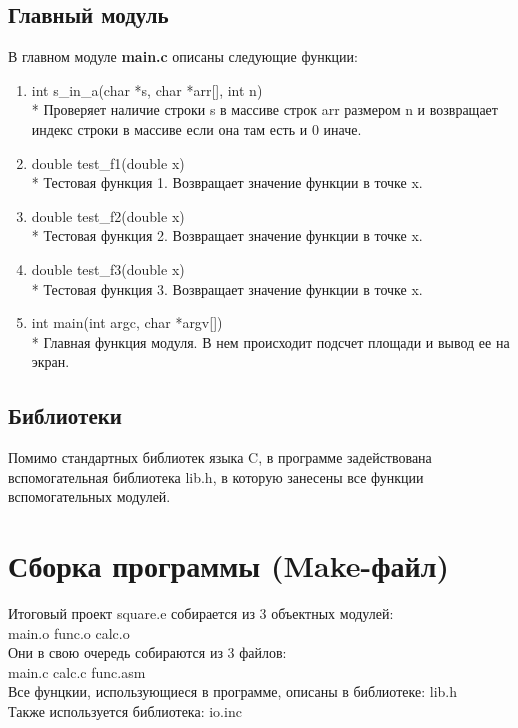 \documentclass[a4paper,12pt,titlepage,finall]{article}
\begin{document}
\subsection{Главный модуль}

В главном модуле \textbf{main.c} описаны следующие функции:

\begin{enumerate}
    \item int s\_in\_a(char *s, char *arr[], int n)
    \\* Проверяет наличие строки s в массиве строк arr размером n и возвращает индекс строки в массиве если она там есть и 0 иначе.
    \item double test\_f1(double x)
    \\* Тестовая функция 1. Возвращает значение функции в точке x.
    \item double test\_f2(double x)
    \\* Тестовая функция 2. Возвращает значение функции в точке x.
    \item double test\_f3(double x)
    \\* Тестовая функция 3. Возвращает значение функции в точке x.
    \item int main(int argc, char *argv[])
    \\* Главная функция модуля. В нем происходит подсчет площади и вывод ее на экран.
\end{enumerate}

\subsection{Библиотеки}

Помимо стандартных библиотек языка C, в программе задействована вспомогательная библиотека lib.h, в которую занесены все функции вспомогательных модулей.

\newpage

\section{Сборка программы (Make-файл)}
Итоговый проект square.e собирается из 3 объектных модулей: \\ 
main.o func.o calc.o \\
Они в свою очередь собираются из 3 файлов: \\
main.c calc.c func.asm \\
Все фунцкии, использующиеся в программе, описаны в библиотеке: lib.h \\
Также используется библиотека: io.inc
\end{document}

